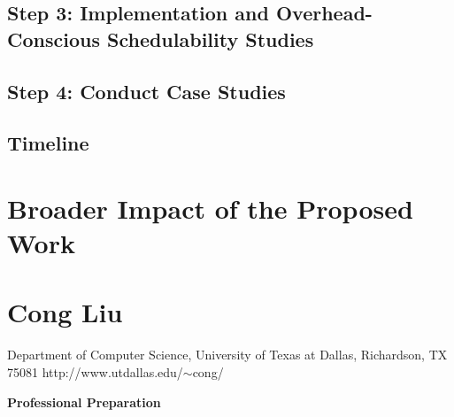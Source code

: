 \documentclass[10pt,letterpaper]{article}
\newcommand{\required}[1]{\section*{\hfil #1\hfil}}                    %
\begin{document}
\subsection{Step 3: Implementation and Overhead-Conscious Schedulability Studies}
\label{sec:step3}



\subsection{Step 4: Conduct Case Studies}
\label{sec:step4}



\subsection{Timeline}
\label{sec:timeline}



\section{Broader Impact of the Proposed Work}
\label{sec:impact}



\newpage
{}

 



\newpage
{}
\thispagestyle{empty}

\required{Cong Liu}
\vspace{-3mm}
\begin{center}
Department of Computer Science, University of Texas at Dallas, Richardson, TX 75081
http://www.utdallas.edu/$\sim$cong/
\end{center}


\noindent \textbf{Professional Preparation}\
\end{document}
